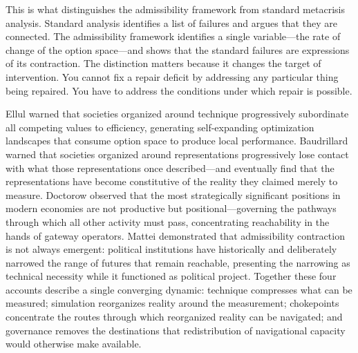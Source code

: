 \documentclass[11pt, letterpaper]{article}
\begin{document}
This is what distinguishes the admissibility framework from standard metacrisis analysis. Standard analysis identifies a list of failures and argues that they are connected. The admissibility framework identifies a single variable---the rate of change of the option space---and shows that the standard failures are expressions of its contraction. The distinction matters because it changes the target of intervention. You cannot fix a repair deficit by addressing any particular thing being repaired. You have to address the conditions under which repair is possible.

Ellul warned that societies organized around technique progressively subordinate all competing values to efficiency, generating self-expanding optimization landscapes that consume option space to produce local performance. Baudrillard warned that societies organized around representations progressively lose contact with what those representations once described---and eventually find that the representations have become constitutive of the reality they claimed merely to measure. Doctorow observed that the most strategically significant positions in modern economies are not productive but positional---governing the pathways through which all other activity must pass, concentrating reachability in the hands of gateway operators. Mattei demonstrated that admissibility contraction is not always emergent: political institutions have historically and deliberately narrowed the range of futures that remain reachable, presenting the narrowing as technical necessity while it functioned as political project. Together these four accounts describe a single converging dynamic: technique compresses what can be measured; simulation reorganizes reality around the measurement; chokepoints concentrate the routes through which reorganized reality can be navigated; and governance removes the destinations that redistribution of navigational capacity would otherwise make available.
\end{document}
